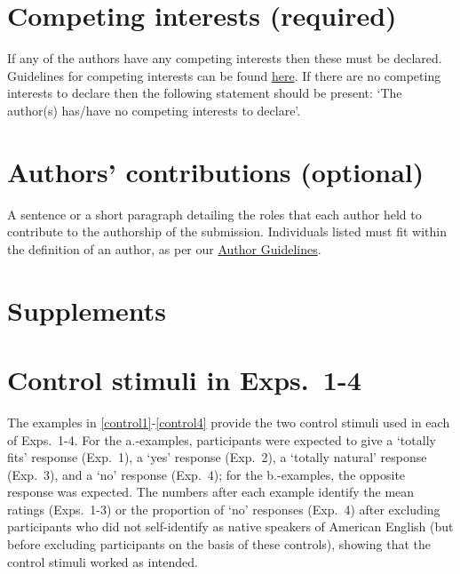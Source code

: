 \documentclass[times,linguex,xcolor]{glossa}
\begin{document}
\section*{Competing interests (required)}

If any of the authors have any competing interests then these must be declared. Guidelines for competing interests can be found \href{https://www.glossa-journal.org/site/competing-interests/}{here}. If there are no competing interests to declare then the following statement should be present: `The author(s) has/have no competing interests to declare'.

\section*{Authors' contributions (optional)}\label{contrib}

A sentence or a short paragraph detailing the roles that each author held to contribute to the authorship of the submission.  Individuals listed must fit within the definition of an author, as per our \href{https://www.glossa-journal.org/site/author-guidelines/}{Author Guidelines}.

\nocite{*} %



\appendix

\setcounter{table}{0}
\renewcommand{\thetable}{A\arabic{table}}

\setcounter{figure}{0}
\renewcommand{\thefigure}{A\arabic{figure}}

\setcounter{ExNo}{0}


\section*{Supplements}

\section{Control stimuli in Exps.~1-4}\label{supp:stims}

The examples in \ref{control1}-\ref{control4} provide the two control stimuli used in each of Exps.~1-4. For the a.-examples, participants were expected to give a `totally fits' response (Exp.~1), a `yes' response (Exp.~2), a `totally natural' response (Exp.~3), and a `no' response (Exp.~4); for the b.-examples, the opposite response was expected. The numbers  after each example identify the mean ratings (Exps.~1-3) or the proportion of `no' responses (Exp.~4) after excluding participants who did not self-identify as native speakers of American English (but before excluding participants on the basis of these controls), showing that the control stimuli worked as intended.
\end{document}
